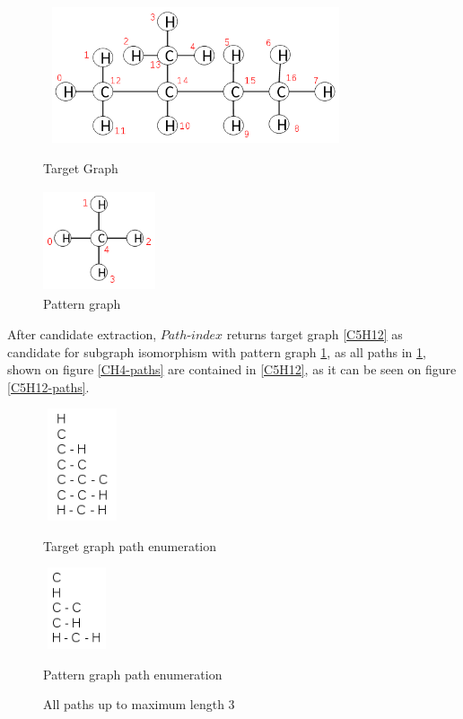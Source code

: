 \documentclass{l4proj}
\theoremstyle{definition}
\begin{document}
\begin{figure}[H]
\centering
\begin{minipage}[t]{.5\textwidth}
  \centering
  \includegraphics[height=4cm,width=9cm]{images/graphs/C5H12.png}
  \caption{Target Graph}
  \label{C5H12}
\end{minipage}%
\begin{minipage}[t]{.5\textwidth}
  \centering
  \includegraphics[height=3cm,width=3.3cm]{images/graphs/CH4.png}
  \caption{Pattern graph}
  \label{CH4}
\end{minipage}
\end{figure}
After candidate extraction, $Path$-$index$ returns target graph \ref{C5H12} as candidate for subgraph isomorphism with pattern graph \ref{CH4}, as all paths in \ref{CH4}, shown on figure \ref{CH4-paths} are contained in \ref{C5H12}, as it can be seen on figure \ref{C5H12-paths}.\par
\begin{figure}[H]
\centering
\begin{minipage}[t]{.5\textwidth}
  \centering
  \includegraphics[height=3.3cm,width=2.3cm]{images/paths/C5H12.png}
  \caption{Target graph path enumeration}
  \label{C5H12-paths}
\end{minipage}%
\begin{minipage}[t]{.5\textwidth}
  \centering
  \includegraphics[height=2.4cm,width=2cm]{images/paths/CH4.png}
  \caption{Pattern graph path enumeration}
  \label{CH4-paths}
\end{minipage}
\caption{All paths up to maximum length 3}
\label{pathsEnumeration}
\end{figure}
\end{document}
